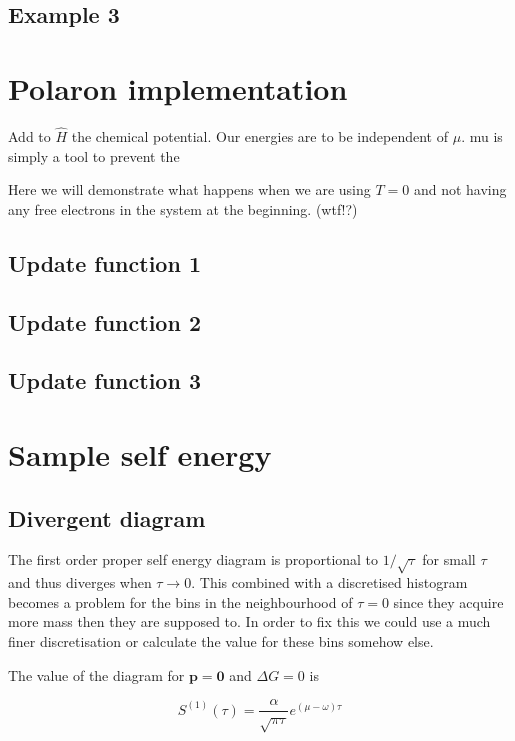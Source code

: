 \documentclass[12pt]{report}
\renewcommand{\vec}[1]{\boldsymbol{\mathbf{#1}}}                        %
\newcommand{\todo}[1]{{\leavevmode\color{todo}#1}}
\begin{document}
\subsection{Example 3}

\section{Polaron implementation}


\todo{Add to $ \hat H $ the chemical potential. Our energies are to be independent of $ \mu $. mu is simply a tool to prevent the}

\todo{Here we will demonstrate what happens when we are using $ T = 0 $ and not having any free electrons in the system at the beginning. (wtf!?)}

\subsection{Update function 1}
\subsection{Update function 2}
\subsection{Update function 3}

\section{Sample self energy}

\subsection{Divergent diagram}

The first order proper self energy diagram is proportional to $ 1/\sqrt{\tau} $ for small $ \tau $ and thus diverges when $ \tau \rightarrow 0 $. This combined with a discretised histogram becomes a problem for the bins in the neighbourhood of $ \tau = 0 $ since they acquire more mass then they are supposed to. In order to fix this we could use a much finer discretisation or calculate the value for these bins somehow else.

The value of the diagram for $ \vec p = \vec 0 $ and $ \Delta G = 0 $ is

\begin{equation}
	S^{(1)}(\tau) = \frac{\alpha}{\sqrt{\pi \tau}} e^{(\mu - \omega)\tau}
\end{equation}
\end{document}
